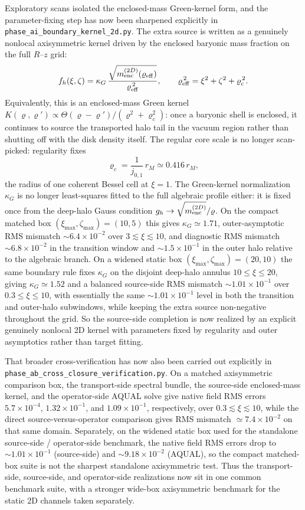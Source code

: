 \documentclass[11pt]{article}
\begin{document}
Exploratory scans isolated the enclosed-mass Green-kernel form, and the
parameter-fixing step has now been sharpened explicitly in
\nolinkurl{phase_ai_boundary_kernel_2d.py}.  The extra source is written as a
genuinely nonlocal axisymmetric kernel driven by the enclosed baryonic mass
fraction on the full $R$--$z$ grid:
\[
f_h(\xi,\zeta)=\kappa_G\,
\frac{\sqrt{m_{\rm enc}^{(2D)}(\varrho_{\rm eff})}}
{\varrho_{\rm eff}^{\,2}},
\qquad
\varrho_{\rm eff}^{\,2}=\xi^2+\zeta^2+\varrho_c^{\,2}.
\]
Equivalently, this is an enclosed-mass Green kernel
$K(\varrho,\varrho')\propto \Theta(\varrho-\varrho')/
(\varrho^2+\varrho_c^2)$: once a baryonic shell is enclosed, it continues to
source the transported halo tail in the vacuum region rather than shutting off
with the disk density itself.  The regular core scale is no longer scan-picked:
regularity fixes
\[
\varrho_c=\frac{1}{j_{0,1}}\,r_M\simeq0.416\,r_M,
\]
the radius of one coherent Bessel cell at $\xi=1$.  The Green-kernel
normalization $\kappa_G$ is no longer least-squares fitted to the full
algebraic profile either: it is fixed once from the deep-halo Gauss condition
$g_h\to\sqrt{m_{\rm enc}^{(2D)}}/\varrho$.  On the compact matched box
$(\xi_{\max},\zeta_{\max})=(10,5)$ this gives $\kappa_G\simeq1.71$,
outer-asymptotic RMS mismatch $\sim6.4\times10^{-2}$ over
$3\lesssim\xi\lesssim10$, and diagnostic RMS mismatch
$\sim6.8\times10^{-2}$ in the transition window and $\sim1.5\times10^{-1}$ in
the outer halo relative to the algebraic branch.  On a widened static box
$(\xi_{\max},\zeta_{\max})=(20,10)$ the same boundary rule fixes $\kappa_G$ on
the disjoint deep-halo annulus $10\le\xi\le20$, giving
$\kappa_G\simeq1.52$ and a balanced source-side RMS mismatch
$\sim1.01\times10^{-1}$ over $0.3\le\xi\le10$, with essentially the same
$\sim1.01\times10^{-1}$ level in both the transition and outer-halo
subwindows, while keeping the extra source non-negative throughout the grid.
So the source-side completion is now realized by an explicit genuinely
nonlocal 2D kernel with parameters fixed by regularity and outer asymptotics
rather than target fitting.

That broader cross-verification has now also been carried out explicitly in
\nolinkurl{phase_ab_cross_closure_verification.py}.  On a matched axisymmetric
comparison box, the transport-side spectral bundle, the source-side enclosed-mass
kernel, and the operator-side AQUAL solve give native field RMS errors
$5.7\times10^{-4}$, $1.32\times10^{-1}$, and $1.09\times10^{-1}$, respectively,
over $0.3\lesssim\xi\lesssim10$, while the direct source-versus-operator
comparison gives RMS mismatch $\simeq7.4\times10^{-2}$ on that same domain.
Separately, on the widened static box used for the standalone source-side /
operator-side benchmark, the native field RMS errors drop to
$\sim1.01\times10^{-1}$ (source-side) and $\sim9.18\times10^{-2}$ (AQUAL), so
the compact matched-box suite is not the sharpest standalone axisymmetric test.
Thus the transport-side, source-side, and operator-side realizations now sit in
one common benchmark suite, with a stronger wide-box axisymmetric benchmark for
the static 2D channels taken separately.
\end{document}

